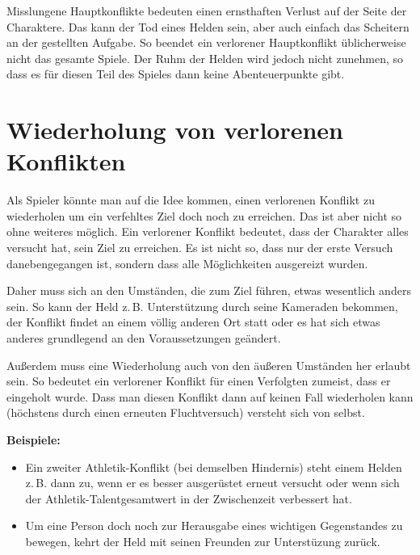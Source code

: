 Misslungene Hauptkonflikte bedeuten einen ernsthaften Verlust auf der Seite der Charaktere. Das kann der Tod eines Helden sein, aber auch einfach das Scheitern an der gestellten Aufgabe. So beendet ein verlorener Hauptkonflikt üblicherweise nicht das gesamte Spiele. Der Ruhm der Helden wird jedoch nicht zunehmen, so dass es für diesen Teil des Spieles dann keine Abenteuerpunkte gibt.

\section{Wiederholung von verlorenen Konflikten}

Als Spieler könnte man auf die Idee kommen, einen verlorenen Konflikt zu wiederholen um ein verfehltes Ziel doch noch zu erreichen. Das ist aber nicht so ohne weiteres möglich. Ein verlorener Konflikt bedeutet, dass der Charakter alles versucht hat, sein Ziel zu erreichen. Es ist nicht so, dass nur der erste Versuch danebengegangen ist, sondern dass alle Möglichkeiten ausgereizt wurden.

Daher muss sich an den Umständen, die zum Ziel führen, etwas wesentlich anders sein. So kann der Held z.\,B. Unterstützung durch seine Kameraden bekommen, der Konflikt findet an einem völlig anderen Ort statt oder es hat sich etwas anderes grundlegend an den Voraussetzungen geändert.

Außerdem muss eine Wiederholung auch von den äußeren Umständen her erlaubt sein. So bedeutet ein verlorener Konflikt für einen Verfolgten zumeist, dass er eingeholt wurde. Dass man diesen Konflikt dann auf keinen Fall wiederholen kann (höchstens durch einen erneuten Fluchtversuch) versteht sich von selbst.

\begin{beispiel}
\textbf{Beispiele:}
\begin{itemize}
  \item Ein zweiter Athletik-Konflikt (bei demselben Hindernis) steht einem Helden z.\,B. dann zu, wenn er es besser ausgerüstet erneut versucht oder wenn sich der Athletik-Talentgesamtwert in der Zwischenzeit verbessert hat.

  \item Um eine Person doch noch zur Herausgabe eines wichtigen Gegenstandes zu bewegen, kehrt der Held mit seinen Freunden zur Unterstüzung zurück.
\end{itemize}
\end{beispiel}

